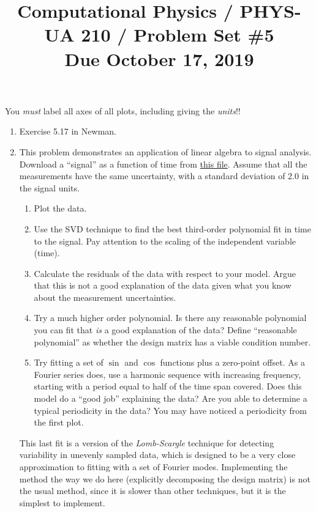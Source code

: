 \documentclass[11pt, preprint]{aastex}
\begin{document}
\title{\bf Computational Physics / PHYS-UA 210 / Problem Set \#5
\\ Due October 17, 2019 }

You {\it must} label all axes of all plots, including giving the {\it
  units}!!

\begin{enumerate}
  \item Exercise 5.17 in Newman.
  \item This problem demonstrates an application of linear algebra to
    signal analysis. Download a ``signal'' as a function of time from
    \href{https://github.com/blanton144/computational-grad/blob/main/data/signal.dat}{this
      file}. Assume that all the measurements have the same
    uncertainty, with a standard deviation of 2.0 in the signal units.
    \begin{enumerate}
      \item Plot the data.
      \item Use the SVD technique to find the best third-order
        polynomial fit in time to the signal. Pay attention to the
        scaling of the independent variable (time).
      \item Calculate the residuals of the data with respect to your
        model. Argue that this is not a good explanation of the data
        given what you know about the measurement uncertainties.
      \item Try a much higher order polynomial. Is there any
        reasonable polynomial you can fit that {\it is} a good
        explanation of the data? Define ``reasonable polynomial'' as
        whether the design matrix has a viable condition number.
      \item Try fitting a set of $\sin$ and $\cos$ functions plus a
        zero-point offset. As a Fourier series does, use a harmonic
        sequence with increasing frequency, starting with a period
        equal to half of the time span covered. Does this model do a
        ``good job'' explaining the data? Are you able to determine a
        typical periodicity in the data? You may have noticed a
        periodicity from the first plot.
    \end{enumerate}
    This last fit is a version of the {\it Lomb-Scargle} technique for
    detecting variability in unevenly sampled data, which is designed
    to be a very close approximation to fitting with a set of Fourier
    modes. Implementing the method the way we do here (explicitly
    decomposing the design matrix) is not the usual method, since it
    is slower than other techniques, but it is the simplest to
    implement.
\end{enumerate}
\end{document}
